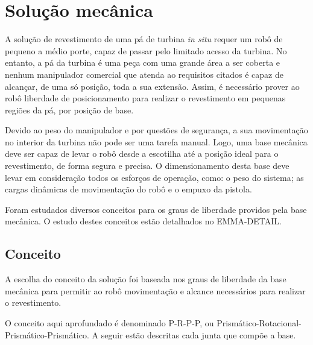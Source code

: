 \section{Solução mecânica}

A solução de revestimento de uma pá de turbina \textit{in situ} requer um robô
de pequeno a médio porte, capaz de passar pelo limitado acesso da turbina. 
No entanto, a pá da turbina é uma peça com uma grande área a ser coberta e
nenhum manipulador comercial que atenda ao requisitos citados é capaz de
alcançar, de uma só posição, toda a sua extensão.
Assim, é necessário prover ao robô liberdade de posicionamento para realizar o
revestimento em pequenas regiões da pá, por posição de base.

Devido ao peso do manipulador e por questões de segurança, a sua movimentação no
interior da turbina não pode ser uma tarefa manual. Logo, uma base mecânica deve
ser capaz de levar o robô desde a escotilha até a posição ideal para o
revestimento, de forma segura e precisa. O dimensionamento desta base deve levar
em consideração todos os esforços de operação, como: o peso do sistema; as
cargas dinâmicas de movimentação do robô e o empuxo da pistola.

Foram estudados diversos conceitos para os graus de liberdade providos pela
base mecânica. O estudo destes conceitos estão detalhados no EMMA-DETAIL.

\subsection{Conceito}

A escolha do conceito da solução foi baseada nos graus de liberdade da base
mecânica para permitir ao robô movimentação e alcance necessários para realizar 
o revestimento. 

O conceito aqui aprofundado é denominado P-R-P-P, ou
Prismático-Rotacional-Prismático-Prismático.
A seguir estão descritas cada junta que compõe a base.

